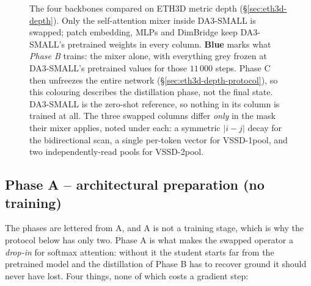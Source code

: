 \documentclass[11pt,a4paper]{article}
\begin{document}
\begin{figure}[!tb]
\caption{The four backbones compared on ETH3D metric depth
(\S\ref{sec:eth3d-depth}). Only the self-attention mixer inside DA3-SMALL is
swapped; patch embedding, MLPs and DimBridge keep DA3-SMALL's pretrained
weights in every column. \textcolor{cTrain!80!black}{\textbf{Blue}} marks what
\emph{Phase B} trains: the mixer alone, with everything grey frozen at DA3-SMALL's
pretrained values for those $11\,000$ steps. Phase C then unfreezes the entire
network (\S\ref{sec:eth3d-depth-protocol}), so this colouring describes the
distillation phase, not the final state. DA3-SMALL is the zero-shot reference,
so nothing in its column is trained at all. The
three swapped columns differ \emph{only} in the mask their mixer applies, noted
under each: a symmetric $|i-j|$ decay for the bidirectional scan, a single
per-token vector for VSSD-1pool, and two independently-read pools for
VSSD-2pool.}
\label{fig:depth-variants}
\end{figure}

\subsection{Phase A -- architectural preparation (no training)}
\label{sec:eth3d-depth-phasea}

The phases are lettered from A, and A is not a training stage, which is why the
protocol below has only two. Phase A is what makes the swapped operator a
\emph{drop-in} for softmax attention: without it the student starts far from the
pretrained model and the distillation of Phase B has to recover ground it should
never have lost. Four things, none of which costs a gradient step:
\end{document}

